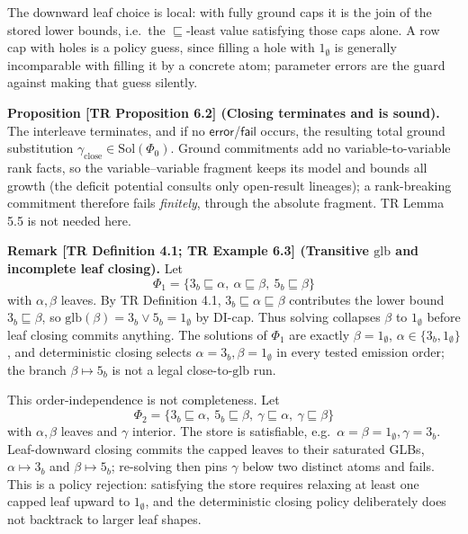 \documentclass[
  10pt,
  letterpaper,
]{article}
\begin{document}
The downward leaf choice is local: with fully ground caps it is the join
of the stored lower bounds, i.e.~the \(\sqsubseteq\)-least value
satisfying those caps alone. A row cap with holes is a policy guess,
since filling a hole with \(1_\emptyset\) is generally incomparable with
filling it by a concrete atom; parameter errors are the guard against
making that guess silently.

\textbf{Proposition {[}TR Proposition 6.2{]} (Closing terminates and is
sound).} The interleave terminates, and if no
\(\mathsf{error}\)/\(\mathsf{fail}\) occurs, the resulting total ground
substitution \(\gamma_{\mathrm{close}} \in \mathrm{Sol}(\Phi_0)\).
Ground commitments add no variable-to-variable rank facts, so the
variable--variable fragment keeps its model and bounds all growth (the
deficit potential consults only open-result lineages); a rank-breaking
commitment therefore fails \emph{finitely}, through the absolute
fragment. TR Lemma 5.5 is not needed here.

\textbf{Remark {[}TR Definition 4.1; TR Example 6.3{]} (Transitive
\(\mathrm{glb}\) and incomplete leaf closing).} Let \[
\Phi_1 = \{3_b \sqsubseteq \alpha,\ \alpha \sqsubseteq \beta,\ 5_b \sqsubseteq \beta\}
\] with \(\alpha,\beta\) leaves. By TR Definition 4.1,
\(3_b \sqsubseteq \alpha \sqsubseteq \beta\) contributes the lower bound
\(3_b \sqsubseteq \beta\), so
\(\mathrm{glb}(\beta)=3_b \vee 5_b = 1_\emptyset\) by DI-cap. Thus
solving collapses \(\beta\) to \(1_\emptyset\) before leaf closing
commits anything. The solutions of \(\Phi_1\) are exactly
\(\beta = 1_\emptyset\), \(\alpha \in \{3_b, 1_\emptyset\}\), and
deterministic closing selects \(\alpha=3_b,\beta=1_\emptyset\) in every
tested emission order; the branch \(\beta \mapsto 5_b\) is not a legal
close-to-\(\mathrm{glb}\) run.

This order-independence is not completeness. Let \[
\Phi_2 = \{3_b \sqsubseteq \alpha,\ 5_b \sqsubseteq \beta,\ \gamma \sqsubseteq \alpha,\ \gamma \sqsubseteq \beta\}
\] with \(\alpha,\beta\) leaves and \(\gamma\) interior. The store is
satisfiable, e.g.~\(\alpha=\beta=1_\emptyset,\gamma=3_b\). Leaf-downward
closing commits the capped leaves to their saturated GLBs,
\(\alpha \mapsto 3_b\) and \(\beta \mapsto 5_b\); re-solving then pins
\(\gamma\) below two distinct atoms and fails. This is a policy
rejection: satisfying the store requires relaxing at least one capped
leaf upward to \(1_\emptyset\), and the deterministic closing policy
deliberately does not backtrack to larger leaf shapes.
\end{document}
